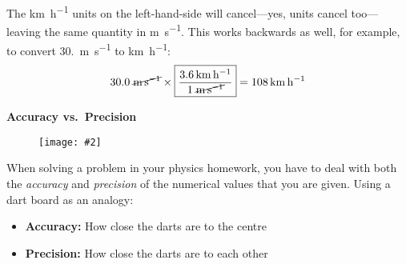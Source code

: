 \documentclass{../../oss-handout}
\newcommand{\pic}[2]{\texttt{[image: \#2]}}
\begin{document}
The \si{\kilo\metre\per\hour} units on the left-hand-side will cancel---yes,
units cancel too---leaving the same quantity in \si{\metre\per\second}. This
works backwards as well, for example, to convert \SI{30.}{\metre\per\second} to
\si{\kilo\metre\per\hour}:
\begin{equation*}
  30.0\;\cancel{\si{\metre\per\second}}
  \times
  \boxed{
    \frac{\SI{3.6}{\kilo\metre\per\hour}}{1\;\cancel{\si{\metre\per\second}}}
  }
  =\SI{108}{\kilo\metre\per\hour}
\end{equation*}
\newpage

\begin{center}
  \textbf{Accuracy vs.\ Precision}
\end{center}

\begin{wrapfigure}{r}{.45\linewidth}
  \centering
  \vspace{-.2in}
  \pic{.45}{../graphics/Darts_in_a_dartboard}
\end{wrapfigure}
When solving a problem in your physics homework, you have to deal with both
the \emph{accuracy} and \emph{precision} of the numerical values that you are
given. Using a dart board as an analogy:
\begin{itemize}
\item\textbf{Accuracy:} How close the darts are to the centre
\item\textbf{Precision:} How close the darts are to each other
\end{itemize}
\end{document}
